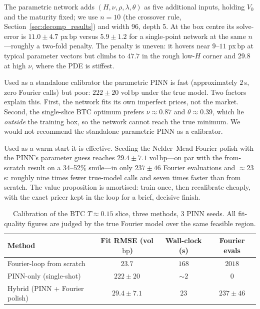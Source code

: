 \documentclass[review,12pt]{elsarticle}
\newcommand{\bp}{\ensuremath{\,\mathrm{bp}}}
\begin{document}
The parametric network adds $(H,\nu,\rho,\lambda,\theta)$ as five additional inputs,
holding $V_0$ and the maturity fixed; we use $n{=}10$ (the crossover rule,
Section~\ref{sec:decomp_results}) and width 96, depth 5.  At the box centre its
solve-error is $11.0\pm4.7$ px\bp{} versus $5.9\pm1.2$ for a single-point network
at the same $n$---roughly a two-fold penalty.  The penalty is uneven: it hovers near
$9$--$11$ px\bp{} at typical parameter vectors but climbs to $47.7$ in the rough
low-$H$ corner and $29.8$ at high $\nu$, where the PDE is stiffest.

Used as a standalone calibrator the parametric PINN is fast (approximately $2$\,s,
zero Fourier calls) but poor: $222\pm20$ vol\bp{} under the true model.  Two
factors explain this.  First, the network fits its own imperfect prices, not the
market.  Second, the single-slice BTC optimum prefers $\nu\approx0.87$ and
$\theta\approx0.39$, which lie \emph{outside} the training box, so the network
cannot reach the true minimum.  We would not recommend the standalone parametric
PINN as a calibrator.

Used as a warm start it is effective.  Seeding the Nelder--Mead Fourier polish
with the PINN's parameter guess reaches $29.4\pm7.1$ vol\bp{}---on par with the
from-scratch result on a 34--52\% smile---in only $237\pm46$ Fourier evaluations
and ${\approx}23$\,s: roughly nine times fewer true-model calls and seven times
faster than from scratch.  The value proposition is amortised: train once,
then recalibrate cheaply, with the exact pricer kept in the loop for a brief,
decisive finish.

\begin{table}[t]
\centering
\caption{Calibration of the BTC $T{\approx}0.15$ slice, three methods, 3 PINN seeds.
All fit-quality figures are judged by the true Fourier model over the same feasible
region.}
\label{tab:calib}
\begin{tabular}{l c c c}
\toprule
Method & Fit RMSE (vol\bp) & Wall-clock (s) & Fourier evals \\
\midrule
Fourier-loop from scratch         & $23.7$        & $168$   & $2018$         \\
PINN-only (single-shot)           & $222\pm20$    & $\sim2$ & $0$            \\
Hybrid (PINN + Fourier polish)    & $29.4\pm7.1$  & $23$    & $237\pm46$     \\
\bottomrule
\end{tabular}
\end{table}
\end{document}
